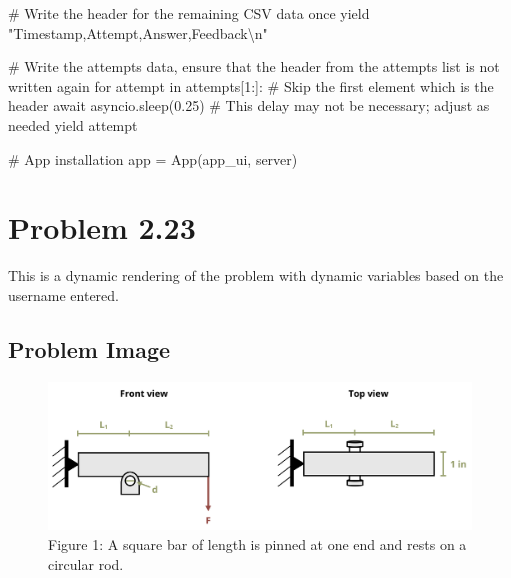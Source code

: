 \documentclass[
  letterpaper,
  DIV=11,
  numbers=noendperiod]{scrreprt}
\newenvironment{Shaded}{\begin{snugshade}}{\end{snugshade}}
\newcommand{\NormalTok}[1]{\textcolor[rgb]{0.00,0.23,0.31}{#1}}
\begin{document}
\begin{Shaded}
\begin{Highlighting}[]
\NormalTok{        \# Write the header for the remaining CSV data once}
\NormalTok{        yield "Timestamp,Attempt,Answer,Feedback\textbackslash{}n"}
        
\NormalTok{        \# Write the attempts data, ensure that the header from the attempts list is not written again}
\NormalTok{        for attempt in attempts[1:]:  \# Skip the first element which is the header}
\NormalTok{            await asyncio.sleep(0.25)  \# This delay may not be necessary; adjust as needed}
\NormalTok{            yield attempt}


\NormalTok{\# App installation}
\NormalTok{app = App(app\_ui, server)}
\end{Highlighting}
\end{Shaded}

\chapter*{Problem 2.23}\label{problem-2.23}


This is a dynamic rendering of the problem with dynamic variables based
on the username entered.

\section*{Problem Image}\label{problem-image-26}


\begin{figure}[H]

{\centering \includegraphics{images/168.png}

}

\caption{Figure 1: A square bar of length is pinned at one end and rests
on a circular rod.}

\end{figure}%
\end{document}
